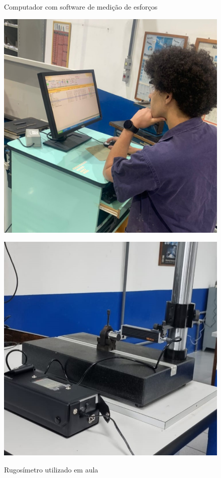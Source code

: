 \documentclass[deposito, acronym, symbols]{fei}
\begin{document}
\begin{figure}[!htp]
  \centering
  \begin{minipage}{0.4\textwidth}
    \centering
    \caption{Computador com software de medição de esforços}
    \includegraphics[width=1\linewidth]{Imagens/Exp01_computador.jpeg}
    \label{fig:comp}
  \end{minipage}
  \hfill
  \begin{minipage}{0.4\textwidth}
        \caption{Rugosímetro utilizado em aula}
    \includegraphics[width=1\linewidth]{Imagens/Exp01_rugosidade - Copia.jpeg}
    \label{fig:rugo}
  \end{minipage}
\end{figure}
\end{document}
